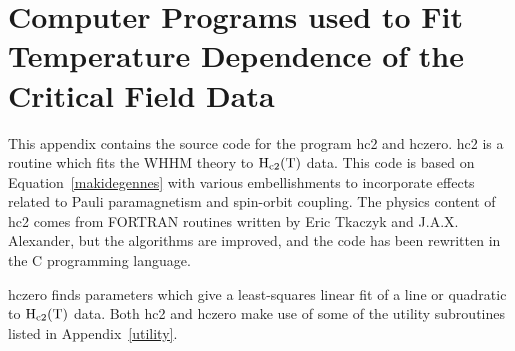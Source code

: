 \chapter[Computer Programs used to Fit $\rm H_{c2}(T)$ Data]{Computer Programs used to Fit Temperature Dependence of the Critical
Field Data}
\label{temprog}
\pagestyle{headings}

        This  appendix contains the  source  code for the   program hc2 and
hczero.  hc2  is a routine  which  fits the WHHM  theory to $\rm H_{c2}(T)$
data.  This    code is based  on Equation~\ref{makidegennes}   with various
embellishments to  incorporate effects related  to Pauli paramagnetism  and
spin-orbit  coupling.   The  physics content  of   hc2 comes  from  FORTRAN
routines written by  Eric Tkaczyk and  J.A.X. Alexander, but the algorithms
are  improved,  and the  code has  been   rewritten in  the   C programming
language.

        hczero finds parameters which give a  least-squares linear fit of a
line or quadratic to  $\rm H_{c2}(T)$ data.  Both hc2  and hczero make use
of some of the utility subroutines listed in Appendix~\ref{utility}.

